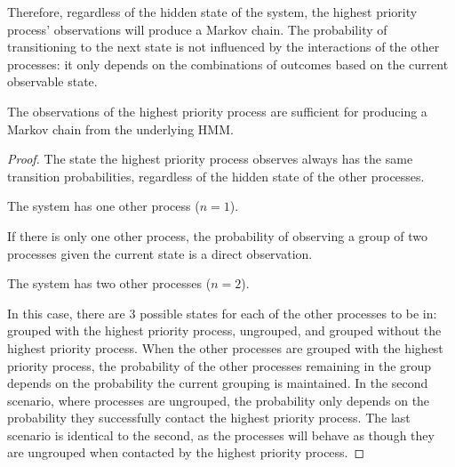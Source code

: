 Therefore, regardless of the hidden state of the system, the highest priority process' observations will produce a Markov chain.
The probability of transitioning to the next state is not influenced by the interactions of the other processes: it only depends on the combinations of outcomes based on the current observable state.

\begin{thm}
    The observations of the highest priority process are sufficient for producing a Markov chain from the underlying \ac{HMM}.
\end{thm}
\begin{proof}
    The state the highest priority process observes always has the same transition probabilities, regardless of the hidden state of the other processes.
\begin{case}
    The system has one other process ($n=1$).
\end{case}
If there is only one other process, the probability of observing a group of two processes given the current state is a direct observation.
\begin{case}
    The system has two other processes ($n=2$).
\end{case}
In this case, there are 3 possible states for each of the other processes to be in: grouped with the highest priority process, ungrouped, and grouped without the highest priority process.
When the other processes are grouped with the highest priority process, the probability of the other processes remaining in the group depends on the probability the current grouping is maintained.
In the second scenario, where processes are ungrouped, the probability only depends on the probability they successfully contact the highest priority process.
The last scenario is identical to the second, as the processes will behave as though they are ungrouped when contacted by the highest priority process.


\end{proof}
